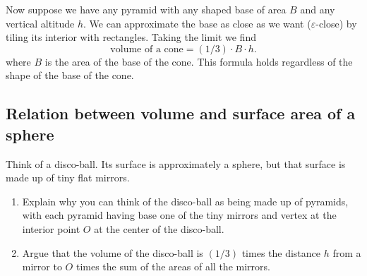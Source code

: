 \documentclass[hints,handout,noauthor,nooutcomes,12pt,newpage]{ximera}
\begin{document}
Now suppose we have any pyramid%
with any shaped base of area $B$ and any vertical altitude $h$. We can
approximate the base as close as we want ($\varepsilon$-close) by
tiling its interior with rectangles. Taking the limit we find 
\[
\text{volume of a cone} =\left(  1/3\right)  \cdot B\cdot h.
\]
where $B$ is the area of the base of the cone. This formula holds regardless of the shape of the base of the cone.








\subsection{Relation between volume and surface area of a sphere}

Think of a disco-ball. Its surface is approximately a sphere, but that
surface is made up of tiny flat mirrors.

\begin{problem}\hfil
\begin{enumerate}
\item Explain why you can think of the disco-ball as being made up of
  pyramids, with each pyramid having base one of the tiny mirrors and
  vertex at the interior point $O$ at the center of the disco-ball.
\item Argue that the volume of the disco-ball is $\left( 1/3\right) $
  times the distance $h$ from a mirror to $O$ times the sum of the
  areas of all the mirrors.
\end{enumerate}
\end{problem}
\end{document}
